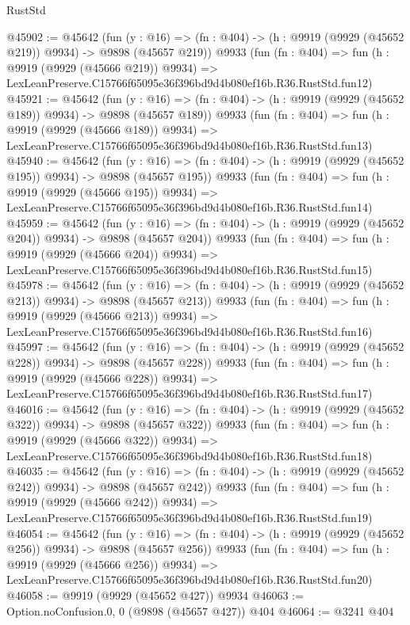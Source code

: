 \begin{lexlean}{RustStd}
\begin{coremodule}
@45902 := @45642
    (fun (y : @16) => (fn : @404) -> (h : @9919 (@9929 (@45652 @219)) @9934) -> @9898 (@45657 @219))
    @9933
    (fun (fn : @404) =>
    fun (h : @9919 (@9929 (@45666 @219)) @9934) =>
    LexLeanPreserve.C15766f65095e36f396bd9d4b080ef16b.R36.RustStd.fun12)
@45921 := @45642
    (fun (y : @16) => (fn : @404) -> (h : @9919 (@9929 (@45652 @189)) @9934) -> @9898 (@45657 @189))
    @9933
    (fun (fn : @404) =>
    fun (h : @9919 (@9929 (@45666 @189)) @9934) =>
    LexLeanPreserve.C15766f65095e36f396bd9d4b080ef16b.R36.RustStd.fun13)
@45940 := @45642
    (fun (y : @16) => (fn : @404) -> (h : @9919 (@9929 (@45652 @195)) @9934) -> @9898 (@45657 @195))
    @9933
    (fun (fn : @404) =>
    fun (h : @9919 (@9929 (@45666 @195)) @9934) =>
    LexLeanPreserve.C15766f65095e36f396bd9d4b080ef16b.R36.RustStd.fun14)
@45959 := @45642
    (fun (y : @16) => (fn : @404) -> (h : @9919 (@9929 (@45652 @204)) @9934) -> @9898 (@45657 @204))
    @9933
    (fun (fn : @404) =>
    fun (h : @9919 (@9929 (@45666 @204)) @9934) =>
    LexLeanPreserve.C15766f65095e36f396bd9d4b080ef16b.R36.RustStd.fun15)
@45978 := @45642
    (fun (y : @16) => (fn : @404) -> (h : @9919 (@9929 (@45652 @213)) @9934) -> @9898 (@45657 @213))
    @9933
    (fun (fn : @404) =>
    fun (h : @9919 (@9929 (@45666 @213)) @9934) =>
    LexLeanPreserve.C15766f65095e36f396bd9d4b080ef16b.R36.RustStd.fun16)
@45997 := @45642
    (fun (y : @16) => (fn : @404) -> (h : @9919 (@9929 (@45652 @228)) @9934) -> @9898 (@45657 @228))
    @9933
    (fun (fn : @404) =>
    fun (h : @9919 (@9929 (@45666 @228)) @9934) =>
    LexLeanPreserve.C15766f65095e36f396bd9d4b080ef16b.R36.RustStd.fun17)
@46016 := @45642
    (fun (y : @16) => (fn : @404) -> (h : @9919 (@9929 (@45652 @322)) @9934) -> @9898 (@45657 @322))
    @9933
    (fun (fn : @404) =>
    fun (h : @9919 (@9929 (@45666 @322)) @9934) =>
    LexLeanPreserve.C15766f65095e36f396bd9d4b080ef16b.R36.RustStd.fun18)
@46035 := @45642
    (fun (y : @16) => (fn : @404) -> (h : @9919 (@9929 (@45652 @242)) @9934) -> @9898 (@45657 @242))
    @9933
    (fun (fn : @404) =>
    fun (h : @9919 (@9929 (@45666 @242)) @9934) =>
    LexLeanPreserve.C15766f65095e36f396bd9d4b080ef16b.R36.RustStd.fun19)
@46054 := @45642
    (fun (y : @16) => (fn : @404) -> (h : @9919 (@9929 (@45652 @256)) @9934) -> @9898 (@45657 @256))
    @9933
    (fun (fn : @404) =>
    fun (h : @9919 (@9929 (@45666 @256)) @9934) =>
    LexLeanPreserve.C15766f65095e36f396bd9d4b080ef16b.R36.RustStd.fun20)
@46058 := @9919 (@9929 (@45652 @427)) @9934
@46063 := Option.noConfusion.{0, 0} (@9898 (@45657 @427)) @404
@46064 := @3241 @404

\end{coremodule}
\end{lexlean}
